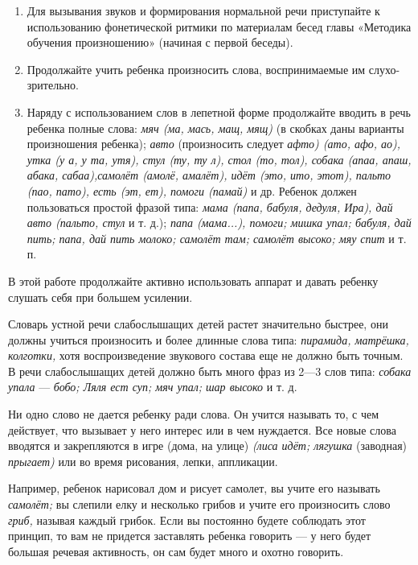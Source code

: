 \documentclass[a5paper]{book}
\renewcommand{\emph}[1]{\textit{#1}}
\begin{document}
\begin{enumerate}
\def\labelenumi{\arabic{enumi}.}
\item
  
  Для вызывания звуков и формирования нормальной речи приступайте к
  использованию фонетической ритмики по материалам бесед главы «Методика
  обучения произношению» (начиная с первой беседы).
  
\item
  
  Продолжайте учить ребенка произносить слова, воспринимаемые им
  слухо-зрительно.
  
\item
  
  Наряду с использованием слов в лепетной форме продолжайте вводить в
  речь ребенка полные слова: \emph{мяч (ма, мась, мащ, мящ)} (в скобках
  даны варианты произношения ребенка); \emph{авто} (произносить следует
  \emph{афто) (ато, афо, ао), утка (у а, у та, утя), стул (ту, ту л),
  стол (то, тол), собака (апаа, апаш, абака, сабаа),самолёт (амолё,
  амалёт), идёт (это, ито, этот), пальто (пао, пато), есть (эт, ет),
  помоги (памай)} и др. Ребенок должен пользоваться простой фразой типа:
  \emph{мама (папа, бабуля, дедуля, Ира), дай авто (пальто, стул} и т.
  д.); \emph{папа (мама...), помоги; мишка упал; бабуля, дай пить; папа,
  дай пить молоко; самолёт там; самолёт высоко; мяу спит} и т. п.
  
\end{enumerate}


В этой работе продолжайте активно использовать аппарат и давать ребенку
слушать себя при большем усилении.

Словарь устной речи слабослышащих детей растет значительно быстрее, они
должны учиться произносить и более длинные слова типа: \emph{пирамида,
матрёшка, колготки,} хотя воспроизведение звукового состава еще не
должно быть точным. В речи слабослышащих детей должно быть много фраз из
2---3 слов типа: \emph{собака упала} --- \emph{бобо; Ляля ест суп; мяч
упал; шар высоко} и т. д.

Ни одно слово не дается ребенку ради слова. Он учится называть то, с чем
действует, что вызывает у него интерес или в чем нуждается. Все новые
слова вводятся и закрепляются в игре (дома, на улице) \emph{(лиса идёт;
лягушка} (заводная) \emph{прыгает)} или во время рисования, лепки,
аппликации.

Например, ребенок нарисовал дом и рисует самолет, вы учите его называть
\emph{самолёт;} вы слепили елку и несколько грибов и учите его
произносить слово \emph{гриб,} называя каждый грибок. Если вы постоянно
будете соблюдать этот принцип, то вам не придется заставлять ребенка
говорить --- у него будет большая речевая активность, он сам будет много
и охотно говорить.
\end{document}
